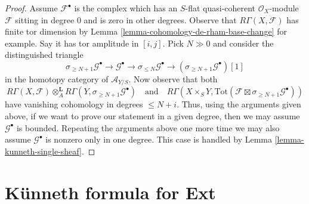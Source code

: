 \documentclass{stacks-project}
\theoremstyle{plain}
\theoremstyle{definition}
\theoremstyle{remark}
\numberwithin{equation}{subsection}
\begin{document}
\begin{proof}
\medskip\noindent
Assume $\mathcal{F}^\bullet$ is the complex which has an $S$-flat quasi-coherent
$\mathcal{O}_X$-module $\mathcal{F}$ sitting in degree $0$ and is zero in
other degrees. Observe that $R\Gamma(X, \mathcal{F})$ has finite
tor dimension by Lemma \ref{lemma-cohomology-de-rham-base-change} for example.
Say it has tor amplitude in $[i, j]$.
Pick $N \gg 0$ and consider the distinguished triangle
$$
\sigma_{\geq N + 1}\mathcal{G}^\bullet \to
\mathcal{G}^\bullet \to
\sigma_{\leq N}\mathcal{G}^\bullet \to
(\sigma_{\geq N + 1}\mathcal{G}^\bullet)[1]
$$
in the homotopy category of $\mathcal{A}_{Y/S}$. Now observe that both
$$
R\Gamma(X, \mathcal{F})
\otimes_A^\mathbf{L}
R\Gamma(Y, \sigma_{\geq N + 1}\mathcal{G}^\bullet)
\quad\text{and}\quad
R\Gamma(X \times_S Y,
\text{Tot}(\mathcal{F} \boxtimes \sigma_{\geq N + 1}\mathcal{G}^\bullet))
$$
have vanishing cohomology in degrees $\leq N + i$. Thus, using the arguments
given above, if we want to prove our statement in a given degree, then we may
assume $\mathcal{G}^\bullet$ is bounded.
Repeating the arguments above one more time we may also assume
$\mathcal{G}^\bullet$ is nonzero only in one degree.
This case is handled by Lemma \ref{lemma-kunneth-single-sheaf}.
\end{proof}







\section{K\"unneth formula for Ext}
\label{section-kunneth-Ext}
\end{document}
